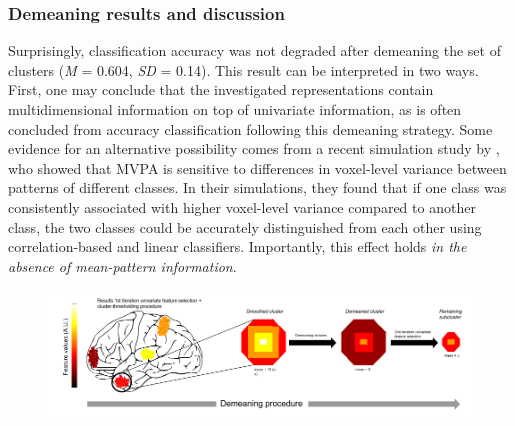 \documentclass[jou,12pt,a4paper]{apa6}
\begin{document}
\subsubsection{Demeaning results and discussion}
\noindent Surprisingly, classification accuracy was not degraded after demeaning the set of clusters (\emph{M} = 0.604, \emph{SD} = 0.14). This result can be interpreted in two ways. First, one may conclude that the investigated representations contain multidimensional information on top of univariate information, as is often concluded from accuracy classification following this demeaning strategy. Some evidence for an alternative possibility comes from a recent simulation study by , who showed that MVPA is sensitive to differences in voxel-level variance between patterns of different classes. In their simulations, they found that if one class was consistently associated with higher voxel-level variance compared to another class, the two classes could be accurately distinguished from each other using correlation-based and linear classifiers. Importantly, this effect holds \emph{in the absence of mean-pattern information}. 

\begin{figure}[ht]
\centering
\includegraphics[width=\textwidth]{demeaning_clusters}
\end{figure}
\end{document}
